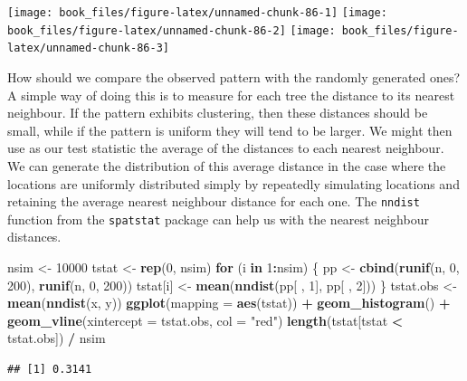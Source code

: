 \documentclass[
]{book}
\newenvironment{Shaded}{\begin{snugshade}}{\end{snugshade}}
\newcommand{\AttributeTok}[1]{\textcolor[rgb]{0.13,0.29,0.53}{#1}}
\newcommand{\ControlFlowTok}[1]{\textcolor[rgb]{0.13,0.29,0.53}{\textbf{#1}}}
\newcommand{\DecValTok}[1]{\textcolor[rgb]{0.00,0.00,0.81}{#1}}
\newcommand{\FunctionTok}[1]{\textcolor[rgb]{0.13,0.29,0.53}{\textbf{#1}}}
\newcommand{\NormalTok}[1]{#1}
\newcommand{\OtherTok}[1]{\textcolor[rgb]{0.56,0.35,0.01}{#1}}
\newcommand{\SpecialCharTok}[1]{\textcolor[rgb]{0.81,0.36,0.00}{\textbf{#1}}}
\newcommand{\StringTok}[1]{\textcolor[rgb]{0.31,0.60,0.02}{#1}}
\begin{document}
\texttt{[image: book\_files/figure-latex/unnamed-chunk-86-1]} \texttt{[image: book\_files/figure-latex/unnamed-chunk-86-2]} \texttt{[image: book\_files/figure-latex/unnamed-chunk-86-3]}

How should we compare the observed pattern with the randomly generated ones? A simple way of doing this is to measure for each tree the distance to its nearest neighbour. If the pattern exhibits clustering, then these distances should be small, while if the pattern is uniform they will tend to be larger. We might then use as our test statistic the average of the distances to each nearest neighbour. We can generate the distribution of this average distance in the case where the locations are uniformly distributed simply by repeatedly simulating locations and retaining the average nearest neighbour distance for each one. The \texttt{nndist} function from the \texttt{spatstat} package can help us with the nearest neighbour distances.

\begin{Shaded}
\begin{Highlighting}[]
\NormalTok{nsim  }\OtherTok{\textless{}{-}} \DecValTok{10000}
\NormalTok{tstat }\OtherTok{\textless{}{-}} \FunctionTok{rep}\NormalTok{(}\DecValTok{0}\NormalTok{, nsim)}
\ControlFlowTok{for}\NormalTok{ (i }\ControlFlowTok{in} \DecValTok{1}\SpecialCharTok{:}\NormalTok{nsim) \{}
\NormalTok{  pp }\OtherTok{\textless{}{-}} \FunctionTok{cbind}\NormalTok{(}\FunctionTok{runif}\NormalTok{(n, }\DecValTok{0}\NormalTok{, }\DecValTok{200}\NormalTok{), }\FunctionTok{runif}\NormalTok{(n, }\DecValTok{0}\NormalTok{, }\DecValTok{200}\NormalTok{))}
\NormalTok{  tstat[i] }\OtherTok{\textless{}{-}} \FunctionTok{mean}\NormalTok{(}\FunctionTok{nndist}\NormalTok{(pp[ , }\DecValTok{1}\NormalTok{], pp[ , }\DecValTok{2}\NormalTok{]))}
\NormalTok{\}}
\NormalTok{tstat.obs }\OtherTok{\textless{}{-}} \FunctionTok{mean}\NormalTok{(}\FunctionTok{nndist}\NormalTok{(x, y))}
\FunctionTok{ggplot}\NormalTok{(}\AttributeTok{mapping =} \FunctionTok{aes}\NormalTok{(tstat)) }\SpecialCharTok{+} \FunctionTok{geom\_histogram}\NormalTok{() }\SpecialCharTok{+}
   \FunctionTok{geom\_vline}\NormalTok{(}\AttributeTok{xintercept =}\NormalTok{ tstat.obs, }\AttributeTok{col =} \StringTok{"red"}\NormalTok{)}
\FunctionTok{length}\NormalTok{(tstat[tstat }\SpecialCharTok{\textless{}}\NormalTok{ tstat.obs]) }\SpecialCharTok{/}\NormalTok{ nsim}
\end{Highlighting}
\end{Shaded}

\begin{verbatim}
## [1] 0.3141
\end{verbatim}
\end{document}
